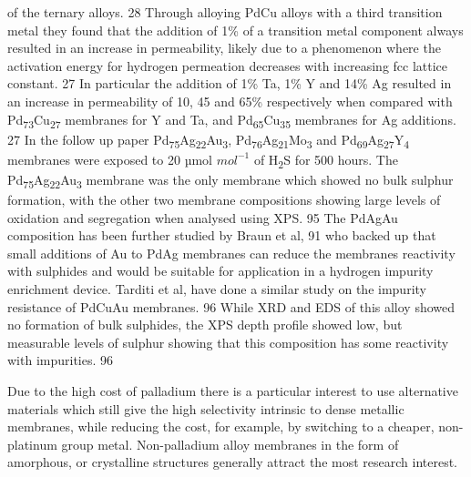 of the ternary alloys. 28 Through alloying PdCu alloys with a third transition metal they 
found that the addition of 1\% of a transition metal component always resulted in an increase 
in permeability, likely due to a phenomenon where the activation energy for hydrogen 
permeation decreases with increasing fcc lattice constant. 27 In particular the addition of 
1\% Ta, 1\% Y and 14\% Ag resulted in an increase in permeability of 10, 45 and 65\% 
respectively when compared with Pd\textsubscript{73}Cu\textsubscript{27} membranes for 
Y and Ta, and Pd\textsubscript{65}Cu\textsubscript{35} membranes for Ag additions. 27 
In the follow up paper Pd\textsubscript{75}Ag\textsubscript{22}Au\textsubscript{3},
Pd\textsubscript{76}Ag\textsubscript{21}Mo\textsubscript{3} and Pd\textsubscript{69}Ag\textsubscript{27}Y\textsubscript{4} 
membranes were exposed to 20 µmol $mol^{-1}$ of H\textsubscript{2}S for 500 hours. 
The Pd\textsubscript{75}Ag\textsubscript{22}Au\textsubscript{3} membrane was the only 
membrane which showed no bulk sulphur formation, with the other two membrane compositions 
showing large levels of oxidation and segregation when analysed using XPS. 95 The 
PdAgAu composition has been further studied by Braun et al, 91 who backed up that small 
additions of Au to PdAg membranes can reduce the membranes reactivity with sulphides and 
would be suitable for application in a hydrogen impurity enrichment device. 
Tarditi et al, have done a similar study on the impurity resistance of PdCuAu membranes. 96 
While XRD and EDS of this alloy showed no formation of bulk sulphides, the XPS depth 
profile showed low, but measurable levels of sulphur showing that this composition has some 
reactivity with impurities. 96

Due to the high cost of palladium there is a particular interest to use alternative materials 
which still give the high selectivity intrinsic to dense metallic membranes, while reducing 
the cost, for example, by switching to a cheaper, non-platinum group metal. Non-palladium 
alloy membranes in the form of amorphous, or crystalline structures generally attract the 
most research interest.


